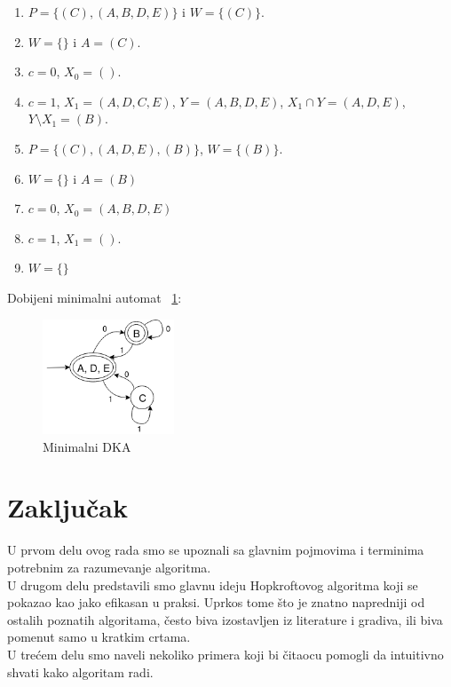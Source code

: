 \documentclass[a4paper]{article}
\begin{document}
\begin{enumerate}
\item $P = \{(C), (A, B, D, E)\}$ i $W = \{(C)\}$.
\item $W = \{\}$ i $A = (C)$.
\item $c = 0$, $X_{0} = ()$.
\item $c = 1$, $X_{1} = (A, D, C, E)$, $Y = (A, B, D, E)$, $X_{1} \cap Y = (A, D, E)$, $Y \setminus X_{1} = (B)$.
\item $P = \{(C), (A, D, E), (B)\}$, $W = \{(B)\}$.
\item $W = \{\}$ i $A = (B)$
\item $c = 0$, $X_{0} = (A, B, D, E)$
\item $c = 1$, $X_{1} = ()$.
\item $W = \{\}$
\end{enumerate}

Dobijeni minimalni automat ~\ref{fig:slika6}:
\begin{figure}[H]
\centering
\includegraphics[width=0.35\textwidth]{Slike/autom6.png}
\caption{\label{fig:slika6}Minimalni DKA}
\end{figure}

\section{Zaključak}
U prvom delu ovog rada smo se upoznali sa glavnim pojmovima i terminima potrebnim za razumevanje algoritma. \\
U drugom delu predstavili smo glavnu ideju Hopkroftovog algoritma koji se pokazao kao jako efikasan u praksi.
Uprkos tome što je znatno napredniji od ostalih poznatih algoritama, često biva izostavljen iz literature i gradiva, ili biva pomenut samo u kratkim crtama.  \\
U trećem delu smo naveli nekoliko primera koji bi čitaocu pomogli da intuitivno shvati kako algoritam radi.

\newpage
\end{document}
